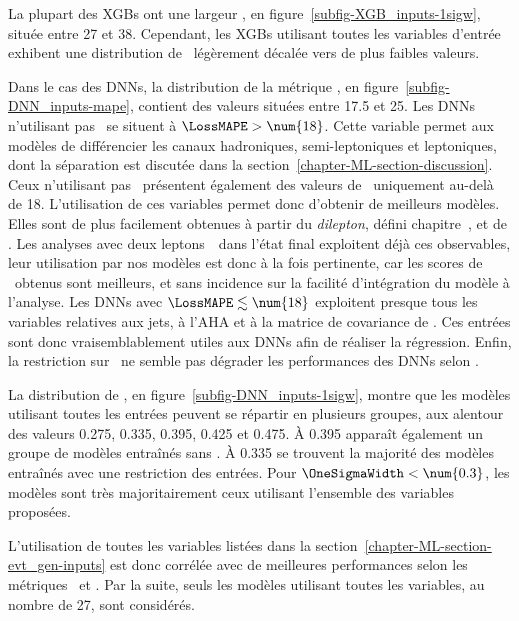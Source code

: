 \par
La plupart des XGBs ont
une largeur \OneSigmaWidth, en figure~\ref{subfig-XGB_inputs-1sigw},
située entre \num{27} et \num{38}.
Cependant,
les XGBs utilisant toutes les variables d'entrée
exhibent une distribution de \OneSigmaWidth\ légèrement décalée vers de plus faibles valeurs.
\par
Dans le cas des DNNs,
la distribution de la métrique \LossMAPE, en figure~\ref{subfig-DNN_inputs-mape},
contient des valeurs situées entre \num{17.5} et \num{25}.
Les DNNs n'utilisant pas \Nnu\
se situent à $\LossMAPE>\num{18}$.
Cette variable permet aux modèles de différencier les canaux
hadroniques, semi-leptoniques et leptoniques,
dont la séparation est discutée dans la section~\ref{chapter-ML-section-discussion}.
Ceux n'utilisant pas \mT\ présentent également des valeurs de \LossMAPE\ uniquement au-delà de \num{18}.
L'utilisation de ces variables permet donc d'obtenir de meilleurs modèles.
Elles sont de plus facilement obtenues à partir du \emph{dilepton}, défini chapitre~, et de \MET.
Les analyses avec deux leptons~\tau\ dans l'état final exploitent déjà ces observables,
leur utilisation par nos modèles est donc à la fois
pertinente, car les scores de \LossMAPE\ obtenus sont meilleurs,
et
sans incidence sur la facilité d'intégration du modèle à l'analyse.
Les DNNs avec $\LossMAPE\lesssim\num{18}$
exploitent presque tous
les variables relatives aux jets, à l'AHA et à la matrice de covariance de \MET.
Ces entrées sont donc vraisemblablement utiles aux DNNs afin de réaliser la régression.
Enfin,
la restriction sur \Npu\
ne semble pas dégrader les performances des DNNs
selon \LossMAPE.
\par
La distribution de
\OneSigmaWidth, en figure~\ref{subfig-DNN_inputs-1sigw},
montre que les modèles utilisant toutes les entrées peuvent se répartir en plusieurs groupes,
aux alentour des valeurs
\num{0.275}, \num{0.335}, \num{0.395}, \num{0.425} et \num{0.475}.
À \num{0.395} apparaît également un groupe de modèles entraînés sans \mT.
À \num{0.335} se trouvent la majorité des modèles entraînés avec une restriction des entrées.
Pour $\OneSigmaWidth<\num{0.3}$, les modèles sont très majoritairement ceux utilisant l'ensemble des variables proposées.
\par
L'utilisation de toutes les variables listées dans la section~\ref{chapter-ML-section-evt_gen-inputs}
est donc corrélée avec de meilleures performances
selon les métriques
\LossMAPE\
et
\OneSigmaWidth.
Par la suite, seuls les modèles utilisant toutes les variables, au nombre de 27, sont considérés.
